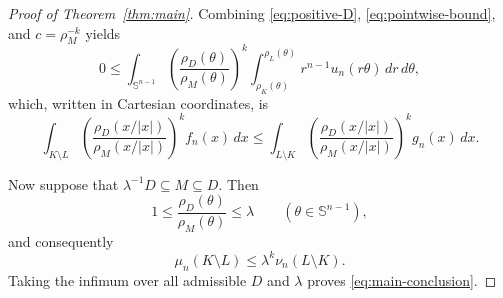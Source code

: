 \documentclass{amsart}
\theoremstyle{remark}
\newcommand{\Sph}{\mathbb{S}}
\newcommand{\dd}{\,d}
\begin{document}
\begin{proof}[Proof of Theorem~\ref{thm:main}]
Combining \eqref{eq:positive-D}, \eqref{eq:pointwise-bound}, and
$c=\rho_M^{-k}$ yields
\[
 0
 \leq
 \int_{\Sph^{n-1}}
 \left(\frac{\rho_D(\theta)}{\rho_M(\theta)}\right)^k
 \int_{\rho_K(\theta)}^{\rho_L(\theta)}
 r^{n-1}u_n(r\theta)\dd r\dd\theta,
\]
which, written in Cartesian coordinates, is
\begin{equation}\label{eq:before-BM}
 \int_{K\setminus L}
 \left(\frac{\rho_D(x/|x|)}{\rho_M(x/|x|)}\right)^k
 f_n(x)\dd x
 \leq
 \int_{L\setminus K}
 \left(\frac{\rho_D(x/|x|)}{\rho_M(x/|x|)}\right)^k
 g_n(x)\dd x.
\end{equation}

Now suppose that $\lambda^{-1}D\subseteq M\subseteq D$. Then
\[
 1\leq\frac{\rho_D(\theta)}{\rho_M(\theta)}\leq\lambda
 \qquad(\theta\in\Sph^{n-1}),
\]
and consequently
\[
 \mu_n(K\setminus L)
 \leq\lambda^k\nu_n(L\setminus K).
\]
Taking the infimum over all admissible $D$ and $\lambda$ proves
\eqref{eq:main-conclusion}.
\end{proof}



\end{document}
